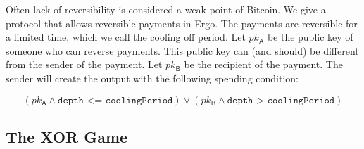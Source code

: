 \documentclass[11pt]{article}
\newcommand{\authnote}[2]{\marginpar{\parbox{\marginparwidth}{\tiny %
  \textsf{#1 {\textcolor{blue}{notes: #2}}}}}%
  \textcolor{blue}{\textbf{\dag}}}
\newcommand{\authnote}[2]{
  \textsf{#1 \textcolor{blue}{: #2}}}
\newcommand{\authnote}[2]{}
\newcommand{\snote}[1]{{\authnote{\textcolor{yellow}{Scalahub notes}}{#1}}}
\begin{document}
Often lack of reversibility is considered a weak point of Bitcoin. We give a protocol that allows reversible payments in Ergo. The payments are reversible for a limited time, which we call the cooling off period. Let $pk_\textsf{A}$ be the public key of someone who can reverse payments. This public key can (and should) be different from the sender of the payment. Let $pk_{\textsf{B}}$ be the recipient of the payment. The sender will create the output with the following spending condition:

 $$(pk_\textsf{A}\land \texttt{depth <= coolingPeriod}) \lor (pk_\textsf{B}\land \texttt{depth > coolingPeriod})$$
 
 \snote{This requires a `depth' instruction, which is current not present. Depth is simply current height - inclusion height.}
\subsection{The XOR Game}
\end{document}
